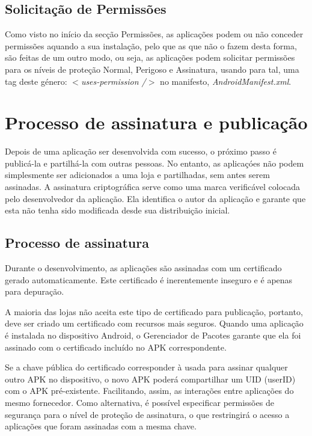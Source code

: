 \subsection{Solicitação de Permissões}
Como visto no início da secção Permissões, as aplicações podem ou não conceder permissões aquando a sua instalação, pelo que as que não o fazem desta forma, são feitas de um outro modo, ou seja, as aplicações podem solicitar permissões para os níveis de proteção Normal, Perigoso e Assinatura, usando para tal, uma tag deste género: \textit{$<$uses-permission /$>$} no manifesto, \textit{AndroidManifest.xml}.



\section{Processo de assinatura e publicação}
Depois de uma aplicação ser desenvolvida com sucesso, o próximo passo é publicá-la e partilhá-la com outras pessoas. No entanto, as aplicaçóes não podem simplesmente ser adicionados a uma loja e partilhadas, sem antes serem assinadas.
A assinatura criptográfica serve como uma marca verificável colocada pelo desenvolvedor da aplicação. Ela identifica o autor da aplicação e garante que esta não tenha sido modificada desde sua distribuição inicial.

\subsection{Processo de assinatura}
Durante o desenvolvimento, as aplicações são assinadas com um certificado gerado automaticamente. Este certificado é inerentemente inseguro e é apenas para depuração. 

A maioria das lojas não aceita este tipo de certificado para publicação, portanto, deve ser criado um certificado com recursos mais seguros. Quando uma aplicação é instalada no dispositivo Android, o Gerenciador de Pacotes garante que ela foi assinado com o certificado incluído no APK correspondente. 

Se a chave pública do certificado corresponder à usada para assinar qualquer outro APK no dispositivo, o novo APK poderá compartilhar um UID (userID) com o APK pré-existente. 
Facilitando, assim, as interações entre aplicações do mesmo fornecedor. Como alternativa, é possível especificar permissões de segurança para o nível de proteção de assinatura, o que restringirá o acesso a aplicações que foram assinadas com a mesma chave.


